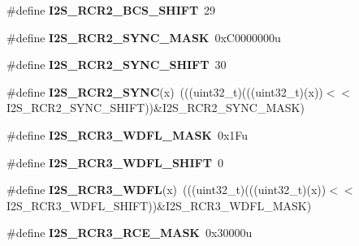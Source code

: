 \begin{DoxyCompactItemize}
\item 
\#define {\bfseries I2\+S\+\_\+\+R\+C\+R2\+\_\+\+B\+C\+S\+\_\+\+S\+H\+I\+FT}~29\hypertarget{group__I2S__Register__Masks_gaad737555e622d9b49f092a83f4e7ea85}{}\label{group__I2S__Register__Masks_gaad737555e622d9b49f092a83f4e7ea85}

\item 
\#define {\bfseries I2\+S\+\_\+\+R\+C\+R2\+\_\+\+S\+Y\+N\+C\+\_\+\+M\+A\+SK}~0x\+C0000000u\hypertarget{group__I2S__Register__Masks_gaf1a919e7fd69cca38a1454b2883fc0f0}{}\label{group__I2S__Register__Masks_gaf1a919e7fd69cca38a1454b2883fc0f0}

\item 
\#define {\bfseries I2\+S\+\_\+\+R\+C\+R2\+\_\+\+S\+Y\+N\+C\+\_\+\+S\+H\+I\+FT}~30\hypertarget{group__I2S__Register__Masks_ga9bb530a10a74f4c58a1866ba1d62fedd}{}\label{group__I2S__Register__Masks_ga9bb530a10a74f4c58a1866ba1d62fedd}

\item 
\#define {\bfseries I2\+S\+\_\+\+R\+C\+R2\+\_\+\+S\+Y\+NC}(x)~(((uint32\+\_\+t)(((uint32\+\_\+t)(x))$<$$<$I2\+S\+\_\+\+R\+C\+R2\+\_\+\+S\+Y\+N\+C\+\_\+\+S\+H\+I\+FT))\&I2\+S\+\_\+\+R\+C\+R2\+\_\+\+S\+Y\+N\+C\+\_\+\+M\+A\+SK)\hypertarget{group__I2S__Register__Masks_ga29dd6e89e4b93cd2ca8ce5af3ede012b}{}\label{group__I2S__Register__Masks_ga29dd6e89e4b93cd2ca8ce5af3ede012b}

\item 
\#define {\bfseries I2\+S\+\_\+\+R\+C\+R3\+\_\+\+W\+D\+F\+L\+\_\+\+M\+A\+SK}~0x1\+Fu\hypertarget{group__I2S__Register__Masks_gab98b46b5057b2fd18a0fefb93eb20450}{}\label{group__I2S__Register__Masks_gab98b46b5057b2fd18a0fefb93eb20450}

\item 
\#define {\bfseries I2\+S\+\_\+\+R\+C\+R3\+\_\+\+W\+D\+F\+L\+\_\+\+S\+H\+I\+FT}~0\hypertarget{group__I2S__Register__Masks_gaab28291891b0e5ced36d580cef82982d}{}\label{group__I2S__Register__Masks_gaab28291891b0e5ced36d580cef82982d}

\item 
\#define {\bfseries I2\+S\+\_\+\+R\+C\+R3\+\_\+\+W\+D\+FL}(x)~(((uint32\+\_\+t)(((uint32\+\_\+t)(x))$<$$<$I2\+S\+\_\+\+R\+C\+R3\+\_\+\+W\+D\+F\+L\+\_\+\+S\+H\+I\+FT))\&I2\+S\+\_\+\+R\+C\+R3\+\_\+\+W\+D\+F\+L\+\_\+\+M\+A\+SK)\hypertarget{group__I2S__Register__Masks_ga18826ab90db71ce827a4ad913cf66387}{}\label{group__I2S__Register__Masks_ga18826ab90db71ce827a4ad913cf66387}

\item 
\#define {\bfseries I2\+S\+\_\+\+R\+C\+R3\+\_\+\+R\+C\+E\+\_\+\+M\+A\+SK}~0x30000u\hypertarget{group__I2S__Register__Masks_ga1609ba1986cd2320ff34a1308599c93b}{}\label{group__I2S__Register__Masks_ga1609ba1986cd2320ff34a1308599c93b}


\end{DoxyCompactItemize}
